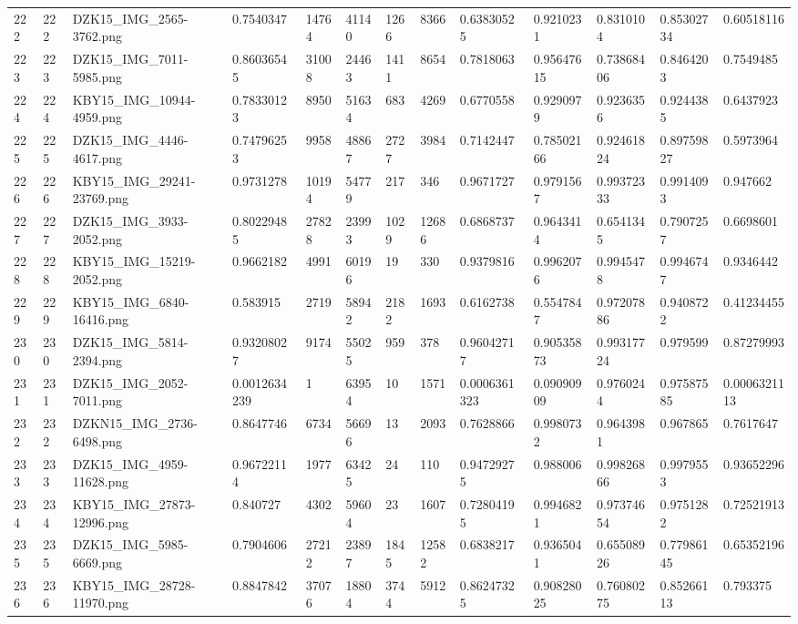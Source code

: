 \documentclass[11pt, a4paper, twoside]{report}
\begin{document}
\begin{longtable}[c]{@{}lllllllllllll@{}}
222 & 222 & DZK15\_IMG\_2565-3762.png & 0.7540347 & 14764 & 41140 & 1266 & 8366 & 0.63830525 & 0.9210231 & 0.8310104 & 0.85302734 & 0.60518116 \\
223 & 223 & DZK15\_IMG\_7011-5985.png & 0.86036545 & 31008 & 24463 & 1411 & 8654 & 0.7818063 & 0.95647615 & 0.73868406 & 0.8464203 & 0.7549485 \\
224 & 224 & KBY15\_IMG\_10944-4959.png & 0.78330123 & 8950 & 51634 & 683 & 4269 & 0.6770558 & 0.9290979 & 0.9236356 & 0.9244385 & 0.6437923 \\
225 & 225 & DZK15\_IMG\_4446-4617.png & 0.74796253 & 9958 & 48867 & 2727 & 3984 & 0.7142447 & 0.78502166 & 0.92461824 & 0.89759827 & 0.5973964 \\
226 & 226 & KBY15\_IMG\_29241-23769.png & 0.9731278 & 10194 & 54779 & 217 & 346 & 0.9671727 & 0.9791567 & 0.99372333 & 0.9914093 & 0.947662 \\
227 & 227 & DZK15\_IMG\_3933-2052.png & 0.80229485 & 27828 & 23993 & 1029 & 12686 & 0.6868737 & 0.9643414 & 0.6541345 & 0.7907257 & 0.6698601 \\
228 & 228 & KBY15\_IMG\_15219-2052.png & 0.9662182 & 4991 & 60196 & 19 & 330 & 0.9379816 & 0.9962076 & 0.9945478 & 0.9946747 & 0.9346442 \\
229 & 229 & KBY15\_IMG\_6840-16416.png & 0.583915 & 2719 & 58942 & 2182 & 1693 & 0.6162738 & 0.5547847 & 0.97207886 & 0.9408722 & 0.41234455 \\
230 & 230 & DZK15\_IMG\_5814-2394.png & 0.93208027 & 9174 & 55025 & 959 & 378 & 0.96042717 & 0.90535873 & 0.99317724 & 0.979599 & 0.87279993 \\
231 & 231 & DZK15\_IMG\_2052-7011.png & 0.0012634239 & 1 & 63954 & 10 & 1571 & 0.0006361323 & 0.09090909 & 0.9760244 & 0.97587585 & 0.0006321113 \\
232 & 232 & DZKN15\_IMG\_2736-6498.png & 0.8647746 & 6734 & 56696 & 13 & 2093 & 0.7628866 & 0.9980732 & 0.9643981 & 0.967865 & 0.7617647 \\
233 & 233 & DZK15\_IMG\_4959-11628.png & 0.96722114 & 1977 & 63425 & 24 & 110 & 0.94729275 & 0.988006 & 0.99826866 & 0.9979553 & 0.93652296 \\
234 & 234 & KBY15\_IMG\_27873-12996.png & 0.840727 & 4302 & 59604 & 23 & 1607 & 0.72804195 & 0.9946821 & 0.97374654 & 0.9751282 & 0.72521913 \\
235 & 235 & DZK15\_IMG\_5985-6669.png & 0.7904606 & 27212 & 23897 & 1845 & 12582 & 0.6838217 & 0.9365041 & 0.65508926 & 0.77986145 & 0.65352196 \\
236 & 236 & KBY15\_IMG\_28728-11970.png & 0.8847842 & 37076 & 18804 & 3744 & 5912 & 0.86247325 & 0.90828025 & 0.76080275 & 0.85266113 & 0.793375 \\

\end{longtable}
\end{document}
